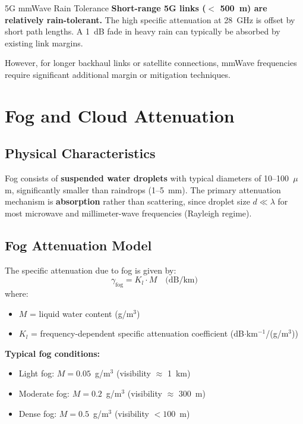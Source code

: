 \begin{calloutbox}{5G mmWave Rain Tolerance}
\textbf{Short-range 5G links ($<$ 500~m) are relatively rain-tolerant.} The high specific attenuation at 28~GHz is offset by short path lengths. A 1~dB fade in heavy rain can typically be absorbed by existing link margins.

However, for longer backhaul links or satellite connections, mmWave frequencies require significant additional margin or mitigation techniques.
\end{calloutbox}

\section{Fog and Cloud Attenuation}

\subsection{Physical Characteristics}

Fog consists of \textbf{suspended water droplets} with typical diameters of 10--100~$\mu$m, significantly smaller than raindrops (1--5~mm). The primary attenuation mechanism is \textbf{absorption} rather than scattering, since droplet size $d \ll \lambda$ for most microwave and millimeter-wave frequencies (Rayleigh regime).

\subsection{Fog Attenuation Model}

The specific attenuation due to fog is given by:
\begin{equation}
\gamma_{\text{fog}} = K_l \cdot M \quad \text{(dB/km)}
\label{eq:fog-atten}
\end{equation}
where:
\begin{itemize}
\item $M$ = liquid water content (g/m$^3$)
\item $K_l$ = frequency-dependent specific attenuation coefficient (dB$\cdot$km$^{-1}$/(g/m$^3$))
\end{itemize}

\textbf{Typical fog conditions:}
\begin{itemize}
\item Light fog: $M = 0.05$~g/m$^3$ (visibility $\approx$ 1~km)
\item Moderate fog: $M = 0.2$~g/m$^3$ (visibility $\approx$ 300~m)
\item Dense fog: $M = 0.5$~g/m$^3$ (visibility $< 100$~m)
\end{itemize}

